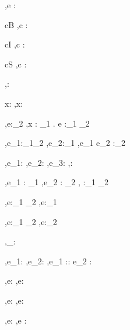 



  {\Gamma,\Sigma \infers e : \tau}


  {c\in B}
  {\Gamma,\Sigma\infers c : \Bool}

  {c\in I}
  {\Gamma,\Sigma\infers c : \Int}

  {c\in S}
  {\Gamma,\Sigma\infers c : \String}


  { }
  {\Gamma,\Sigma\infers \unit : \Unit}


  {x:\tau\in\Gamma}
  {\Gamma,\Sigma\infers x:\tau}


  {\Gamma[x:\tau_1] ,\Sigma \infers e:\tau_2}
  {\Gamma,\Sigma \infers \lambda x : \tau_1 . e :\tau_1 \to \tau_2}

  {\Gamma,\Sigma \infers e_1:\tau_1\to\tau_2 \Quad
   \Gamma,\Sigma \infers e_2:\tau_1}
  {\Gamma,\Sigma \infers e_1 e_2 :\tau_2}


  {\Gamma,\Sigma \infers e_1:\Bool \Quad
   \Gamma,\Sigma \infers e_2:\tau \Quad
   \Gamma,\Sigma \infers e_3:\tau}
  {\Gamma,\Sigma \infers {}:\tau}


    {\Gamma,\Sigma \infers e_1 : \tau_1  \Quad
     \Gamma,\Sigma \infers e_2 : \tau_2}
    {\Gamma,\Sigma \infers {} :\tau_1 \times \tau_2}

  {\Gamma,\Sigma\infers e:\tau_1 \times \tau_2}
  {\Gamma,\Sigma\infers \Fst e:\tau_1}

    {\Gamma,\Sigma\infers e:\tau_1 \times \tau_2}
    {\Gamma,\Sigma\infers \Snd e:\tau_2}

  { }
  {\Gamma,\Sigma\infers [\ ]_\beta : \List\beta}

  {\Gamma,\Sigma\infers e_1:\beta \Quad
   \Gamma,\Sigma\infers e_2:\List\beta}
  {\Gamma,\Sigma\infers e_1 :: e_2 : \List \beta}

  {\Gamma,\Sigma\infers e:\List\beta}
  {\Gamma,\Sigma\infers \Head e:\beta}

    {\Gamma,\Sigma\infers e:\List\beta}
    {\Gamma,\Sigma\infers \Tail e:\List\beta}



  {\Gamma,\Sigma \infers e:\beta}
  {\Gamma,\Sigma \infers \Ref e :\Reference \beta}

